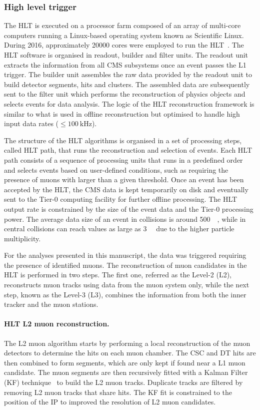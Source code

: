 \subsubsection{High level trigger}\label{sec:Experiment_CMS_Trigger_HLT}

The HLT is executed on a processor farm composed of an array of multi-core computers running a Linux-based operating system known as Scientific Linux. During 2016, approximately 20000 cores were employed to run the HLT~\cite{HLTHardware}. The HLT software is organised in readout, builder and filter units. The readout unit extracts the information from all CMS subsystems once an event passes the L1 trigger. The builder unit assembles the raw data provided by the readout unit to build detector segments, hits and clusters. The assembled data are subsequently sent to the filter unit which performs the reconstruction of physics objects and selects events for data analysis. The logic of the HLT reconstruction framework is similar to what is used in offline reconstruction but optimised to handle high input data rates ($\le\SI{100}{\kHz}$).

The structure of the HLT algorithms is organised in a set of processing steps, called HLT path, that runs the reconstruction and selection of events. Each HLT path consists of a sequence of processing units that runs in a predefined order and selects events based on user-defined conditions, such as requiring the presence of muons with \pt larger than a given threshold. Once an event has been accepted by the HLT, the CMS data is kept temporarily on disk and eventually sent to the Tier-0 computing facility for further offline processing. The HLT output rate is constrained by the size of the event data and the Tier-0 processing power. The average data size of an event in \Runpp collisions is around \SI{500}{\kilo\Bit}, while in central \RunPbPb collisions can reach values as large as \SI{3}{\mega\Bit} due to the higher particle multiplicity.

For the analyses presented in this manuscript, the data was triggered requiring the presence of identified muons. The reconstruction of muon candidates in the HLT is performed in two steps. The first one, referred as the Level-2 (L2), reconstructs muon tracks using data from the muon system only, while the next step, known as the Level-3 (L3), combines the information from both the inner tracker and the muon stations.

\paragraph{HLT L2 muon reconstruction.} The L2 muon algorithm starts by performing a local reconstruction of the muon detectors to determine the hits on each muon chamber. The CSC and DT hits are then combined to form segments, which are only kept if found near a L1 muon candidate. The muon segments are then recursively fitted with a Kalman Filter (KF) technique~\cite{KalmanFilter} to build the L2 muon tracks. Duplicate tracks are filtered by removing L2 muon tracks that share hits. The KF fit is constrained to the position of the IP to improved the \pt resolution of L2 muon candidates.

